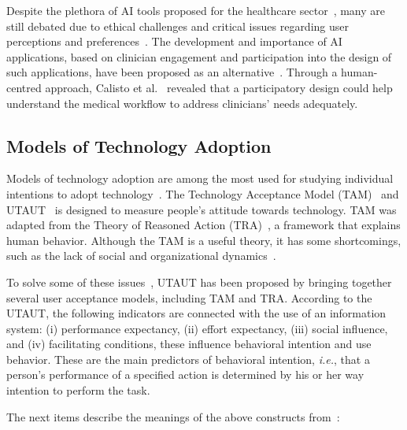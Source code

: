Despite the plethora of AI tools proposed for the healthcare sector~\cite{kohli2018cad, madani2018deep, McKinney2020, sundaram2018predicting}, many are still debated due to ethical challenges and critical issues regarding user perceptions and preferences~\cite{Fan2020, Sutton2020}.
The development and importance of AI applications, based on clinician engagement and participation into the design of such applications, have been proposed as an alternative~\cite{Cai:2019:HTC:3290605.3300234, CALISTO2021102607, Oh:2018:ILY:3173574.3174223, Sousa:2017:VVR:3025453.3025566}.
Through a human-centred approach, Calisto et al.~\cite{CALISTO2021102607} revealed that a participatory design could help understand the medical workflow to address clinicians' needs adequately.

\subsection{Models of Technology Adoption}
\label{sec:chap004002003}

Models of technology adoption are among the most used for studying individual intentions to adopt technology~\cite{HOEHLE201635, MOORE2022102784}.
The Technology Acceptance Model (TAM)~\cite{RePEc:inm:ormnsc:v:35:y:1989:i:8:p:982-1003} and UTAUT~\cite{10.2307/30036540} is designed to measure people’s attitude towards technology.
TAM was adapted from the Theory of Reasoned Action (TRA)~\cite{AJZEN1991179}, a framework that explains human behavior.
Although the TAM is a useful theory, it has some shortcomings, such as the lack of social and organizational dynamics~\cite{LEGRIS2003191}.

To solve some of these issues~\cite{772658}, UTAUT has been proposed by bringing together several user acceptance models, including TAM and TRA.
According to the UTAUT, the following indicators are connected with the use of an information system:
(i) performance expectancy,
(ii) effort expectancy,
(iii) social influence, and
(iv) facilitating conditions, these influence behavioral intention and use behavior.
These are the main predictors of behavioral intention, {\it i.e.}, that a person’s performance of a specified action is determined by his or her way intention to perform the task.

\vspace{2.00mm}

\noindent
The next items describe the meanings of the above constructs from~\cite{10.2307/30036540}:

\vspace{0.00mm}

